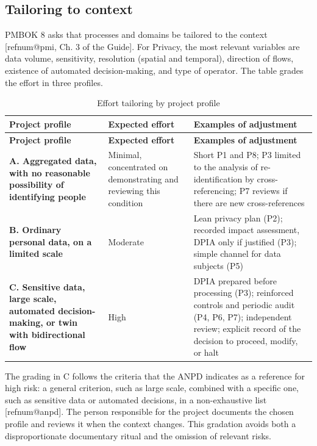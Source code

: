 \documentclass[12pt,a4paper,article,oneside,brazil,english]{abntex2}
\makeatletter
\newcommand{\fontetab}[1]{\par\vspace{3pt}{\small\noindent Source: #1\par}}
\newcommand{\refnum}[1]{\csname refnum@#1\endcsname}
\newcommand{\cit}[1]{[\refnum{#1}]}
\makeatother
\begin{document}
\subsection{Tailoring to context}

PMBOK 8 asks that processes and domains be tailored to the context [\refnum{pmi}, Ch. 3 of the Guide]. For Privacy, the most relevant variables are data volume, sensitivity, resolution (spatial and temporal), direction of flows, existence of automated decision-making, and type of operator. The table grades the effort in three profiles.

\begingroup\SingleSpacing\small
\begin{longtable}{@{}>{\raggedright\arraybackslash}p{}>{\raggedright\arraybackslash}p{}>{\raggedright\arraybackslash}p{}@{}}
\caption{Effort tailoring by project profile}\label{tab:t5}\\
\hline
\textbf{Project profile} & \textbf{Expected effort} & \textbf{Examples of adjustment}\\
\hline
\endfirsthead
\hline
\textbf{Project profile} & \textbf{Expected effort} & \textbf{Examples of adjustment}\\
\hline
\endhead
\hline
\endfoot
\hline
\endlastfoot
\textbf{A. Aggregated data, with no reasonable possibility of identifying people} & Minimal, concentrated on demonstrating and reviewing this condition & Short P1 and P8; P3 limited to the analysis of re-identification by cross-referencing; P7 reviews if there are new cross-references\\[3pt]
\textbf{B. Ordinary personal data, on a limited scale} & Moderate & Lean privacy plan (P2); recorded impact assessment, DPIA only if justified (P3); simple channel for data subjects (P5)\\[3pt]
\textbf{C. Sensitive data, large scale, automated decision-making, or twin with bidirectional flow} & High & DPIA prepared before processing (P3); reinforced controls and periodic audit (P4, P6, P7); independent review; explicit record of the decision to proceed, modify, or halt\\[3pt]
\end{longtable}
\endgroup
\fontetab{Prepared by the authors (2026), based on \cit{anpd}.}

The grading in C follows the criteria that the ANPD indicates as a reference for high risk: a general criterion, such as large scale, combined with a specific one, such as sensitive data or automated decisions, in a non-exhaustive list [\refnum{anpd}]. The person responsible for the project documents the chosen profile and reviews it when the context changes. This gradation avoids both a disproportionate documentary ritual and the omission of relevant risks.
\end{document}
